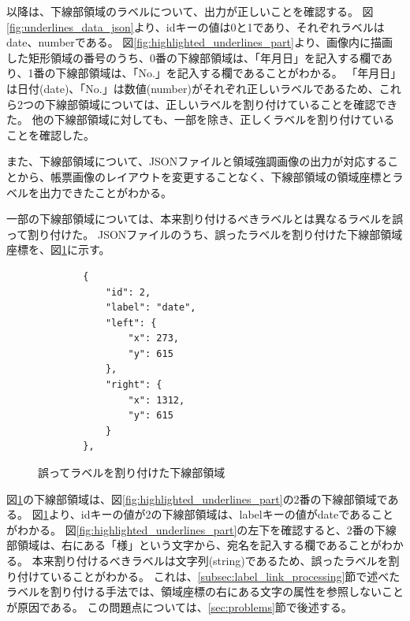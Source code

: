 以降は、下線部領域のラベルについて、出力が正しいことを確認する。
図\ref{fig:underlines_data_json}より、idキーの値は0と1であり、それぞれラベルはdate、numberである。
図\ref{fig:highlighted_underlines_part}より、画像内に描画した矩形領域の番号のうち、0番の下線部領域は、「年月日」を記入する欄であり、1番の下線部領域は、「No.」を記入する欄であることがわかる。
「年月日」は日付(date)、「No.」は数値(number)がそれぞれ正しいラベルであるため、これら2つの下線部領域については、正しいラベルを割り付けていることを確認できた。
他の下線部領域に対しても、一部を除き、正しくラベルを割り付けていることを確認した。

また、下線部領域について、JSONファイルと領域強調画像の出力が対応することから、帳票画像のレイアウトを変更することなく、下線部領域の領域座標とラベルを出力できたことがわかる。

一部の下線部領域については、本来割り付けるべきラベルとは異なるラベルを誤って割り付けた。
JSONファイルのうち、誤ったラベルを割り付けた下線部領域座標を、図\ref{fig:underlines_data_miss_json}に示す。

\lstset{language=}
\begin{figure}[t]
    \begin{lstlisting}
        {
            "id": 2,
            "label": "date",
            "left": {
                "x": 273,
                "y": 615
            },
            "right": {
                "x": 1312,
                "y": 615
            }
        },
    \end{lstlisting}
    \caption{誤ってラベルを割り付けた下線部領域}\label{fig:underlines_data_miss_json}
\end{figure}

図\ref{fig:underlines_data_miss_json}の下線部領域は、図\ref{fig:highlighted_underlines_part}の2番の下線部領域である。
図\ref{fig:underlines_data_miss_json}より、idキーの値が2の下線部領域は、labelキーの値がdateであることがわかる。
図\ref{fig:highlighted_underlines_part}の左下を確認すると、2番の下線部領域は、右にある「様」という文字から、宛名を記入する欄であることがわかる。
本来割り付けるべきラベルは文字列(string)であるため、誤ったラベルを割り付けていることがわかる。
これは、\ref{subsec:label_link_processing}節で述べたラベルを割り付ける手法では、領域座標の右にある文字の属性を参照しないことが原因である。
この問題点については、\ref{sec:problems}節で後述する。